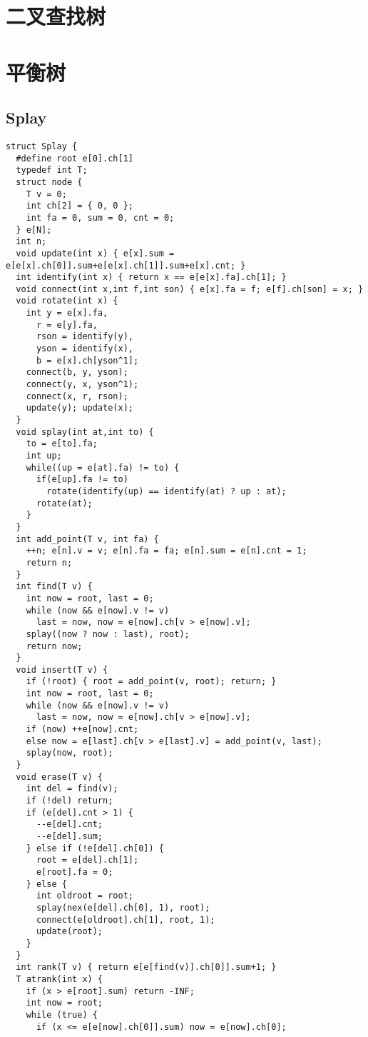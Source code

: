 \documentclass[12pt]{article}
\begin{document}
{{{{{{{{{{{{{{\section{二叉查找树}
\section{平衡树}
\subsection{Splay}
{\setmainfont{Consolas}
\begin{lstlisting}
struct Splay {
  #define root e[0].ch[1]
  typedef int T;
  struct node {
    T v = 0;
    int ch[2] = { 0, 0 };
    int fa = 0, sum = 0, cnt = 0;
  } e[N];
  int n;
  void update(int x) { e[x].sum = e[e[x].ch[0]].sum+e[e[x].ch[1]].sum+e[x].cnt; }
  int identify(int x) { return x == e[e[x].fa].ch[1]; }
  void connect(int x,int f,int son) { e[x].fa = f; e[f].ch[son] = x; }
  void rotate(int x) {
    int y = e[x].fa,
      r = e[y].fa,
      rson = identify(y),
      yson = identify(x),
      b = e[x].ch[yson^1];
    connect(b, y, yson);
    connect(y, x, yson^1);
    connect(x, r, rson);
    update(y); update(x);
  }
  void splay(int at,int to) {
    to = e[to].fa;
    int up;
    while((up = e[at].fa) != to) {
      if(e[up].fa != to)
        rotate(identify(up) == identify(at) ? up : at);
      rotate(at);
    }
  }
  int add_point(T v, int fa) {
    ++n; e[n].v = v; e[n].fa = fa; e[n].sum = e[n].cnt = 1;
    return n;
  }
  int find(T v) {
    int now = root, last = 0;
    while (now && e[now].v != v)
      last = now, now = e[now].ch[v > e[now].v];
    splay((now ? now : last), root);
    return now;
  }
  void insert(T v) {
    if (!root) { root = add_point(v, root); return; }
    int now = root, last = 0;
    while (now && e[now].v != v)
      last = now, now = e[now].ch[v > e[now].v];
    if (now) ++e[now].cnt;
    else now = e[last].ch[v > e[last].v] = add_point(v, last);
    splay(now, root);
  }
  void erase(T v) {
    int del = find(v);
    if (!del) return;
    if (e[del].cnt > 1) {
      --e[del].cnt;
      --e[del].sum;
    } else if (!e[del].ch[0]) {
      root = e[del].ch[1];
      e[root].fa = 0;
    } else {
      int oldroot = root;
      splay(nex(e[del].ch[0], 1), root);
      connect(e[oldroot].ch[1], root, 1);
      update(root);
    }
  }
  int rank(T v) { return e[e[find(v)].ch[0]].sum+1; }
  T atrank(int x) {
    if (x > e[root].sum) return -INF;
    int now = root;
    while (true) {
      if (x <= e[e[now].ch[0]].sum) now = e[now].ch[0];

\end{lstlisting}}}}}}}}}}}}}}}}
\end{document}

